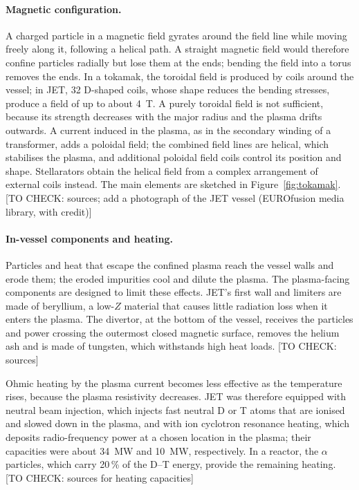 \documentclass{book}
\newcommand{\tocheck}[1]{{\color{red}\small[TO CHECK: #1]}}
\begin{document}
\paragraph{Magnetic configuration.}

A charged particle in a magnetic field gyrates around the field line while
moving freely along it, following a helical path. A straight magnetic field
would therefore confine particles radially but lose them at the ends; bending
the field into a torus removes the ends. In a tokamak, the toroidal field is
produced by coils around the vessel; in JET, 32 D-shaped coils, whose shape
reduces the bending stresses, produce a field of up to about \SI{4}{T}. A
purely toroidal field is not sufficient, because its strength decreases with
the major radius and the plasma drifts outwards. A current induced in the
plasma, as in the secondary winding of a transformer, adds a poloidal field;
the combined field lines are helical, which stabilises the plasma, and
additional poloidal field coils control its position and shape. Stellarators
obtain the helical field from a complex arrangement of external coils instead.
The main elements are sketched in Figure~\ref{fig:tokamak}.
\tocheck{sources; add a photograph of the JET vessel (EUROfusion media library, with credit)}

\paragraph{In-vessel components and heating.}

Particles and heat that escape the confined plasma reach the vessel walls and
erode them; the eroded impurities cool and dilute the plasma. The plasma-facing
components are designed to limit these effects. JET's first wall and limiters
are made of beryllium, a low-$Z$ material that causes little radiation loss
when it enters the plasma. The divertor, at the bottom of the vessel, receives
the particles and power crossing the outermost closed magnetic surface,
removes the helium ash and is made of tungsten, which withstands high heat
loads.
\tocheck{sources}

Ohmic heating by the plasma current becomes less effective as the temperature
rises, because the plasma resistivity decreases. JET was therefore equipped
with neutral beam injection, which injects fast neutral D or T atoms that are
ionised and slowed down in the plasma, and with ion cyclotron resonance
heating, which deposits radio-frequency power at a chosen location in the
plasma; their capacities were about \SI{34}{MW} and \SI{10}{MW},
respectively. In a reactor, the $\alpha$ particles, which carry 20\,\% of the
D--T energy, provide the remaining heating.
\tocheck{sources for heating capacities}
\end{document}
